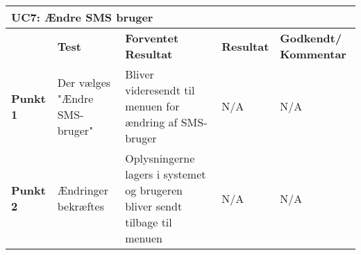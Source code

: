 \begin{table}[htbp] \centering
\begin{tabular}{|p{}|p{}|p{3cm}|p{3cm}|p{3cm}|} %
	\hline
\multicolumn{5}{|l|}{\textbf{UC7: Ændre SMS bruger}} \\\hline
&\textbf{Test} &\textbf{Forventet \newline Resultat} &\textbf{Resultat} &\textbf{Godkendt/ \newline Kommentar} \\\hline
\textbf{Punkt 1} &
Der vælges "Ændre SMS-bruger" &
Bliver videresendt til menuen for ændring af SMS-bruger &
N/A	&
N/A \\\hline
\textbf{Punkt 2}	 &
Ændringer bekræftes &
Oplysningerne lagers i systemet og brugeren bliver sendt tilbage til menuen &
N/A &
N/A \\\hline
	\end{tabular}
	\label{ATUC7} 
\end{table}